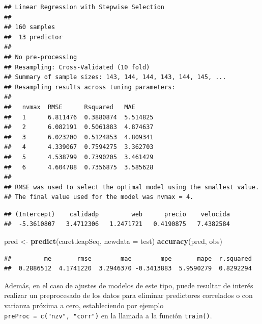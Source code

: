 \documentclass[
  spanish,
]{book}
\newenvironment{Shaded}{\begin{snugshade}}{\end{snugshade}}
\newcommand{\CommentTok}[1]{\textcolor[rgb]{0.56,0.35,0.01}{\textit{#1}}}
\newcommand{\DataTypeTok}[1]{\textcolor[rgb]{0.13,0.29,0.53}{#1}}
\newcommand{\KeywordTok}[1]{\textcolor[rgb]{0.13,0.29,0.53}{\textbf{#1}}}
\newcommand{\NormalTok}[1]{#1}
\newcommand{\OperatorTok}[1]{\textcolor[rgb]{0.81,0.36,0.00}{\textbf{#1}}}
\newcommand{\StringTok}[1]{\textcolor[rgb]{0.31,0.60,0.02}{#1}}
\theoremstyle{break}
\theoremstyle{definition}
\theoremstyle{definition}
\theoremstyle{definition}
\theoremstyle{remark}
\begin{document}
\begin{verbatim}
## Linear Regression with Stepwise Selection 
## 
## 160 samples
##  13 predictor
## 
## No pre-processing
## Resampling: Cross-Validated (10 fold) 
## Summary of sample sizes: 143, 144, 144, 143, 144, 145, ... 
## Resampling results across tuning parameters:
## 
##   nvmax  RMSE      Rsquared   MAE     
##   1      6.811476  0.3880874  5.514825
##   2      6.082191  0.5061883  4.874637
##   3      6.023200  0.5124853  4.809341
##   4      4.339067  0.7594275  3.362703
##   5      4.538799  0.7390205  3.461429
##   6      4.604788  0.7356875  3.585628
## 
## RMSE was used to select the optimal model using the smallest value.
## The final value used for the model was nvmax = 4.
\end{verbatim}

\begin{Shaded}
\end{Shaded}

\begin{verbatim}
## (Intercept)    calidadp         web      precio    velocida 
##  -5.3610807   3.4712306   1.2471721   0.4190875   7.4382584
\end{verbatim}

\begin{Shaded}
\begin{Highlighting}[]
\NormalTok{pred <-}\StringTok{ }\KeywordTok{predict}\NormalTok{(caret.leapSeq, }\DataTypeTok{newdata =}\NormalTok{ test)}
\KeywordTok{accuracy}\NormalTok{(pred, obs)}
\end{Highlighting}
\end{Shaded}

\begin{verbatim}
##         me       rmse        mae        mpe       mape  r.squared 
##  0.2886512  4.1741220  3.2946370 -0.3413883  5.9590279  0.8292294
\end{verbatim}

Además, en el caso de ajustes de modelos de este tipo, puede resultar de interés realizar un preprocesado de los datos para eliminar predictores correlados o con varianza próxima a cero,
estableciendo por ejemplo \texttt{preProc\ =\ c("nzv",\ "corr")} en la llamada a la función \texttt{train()}.
\end{document}
